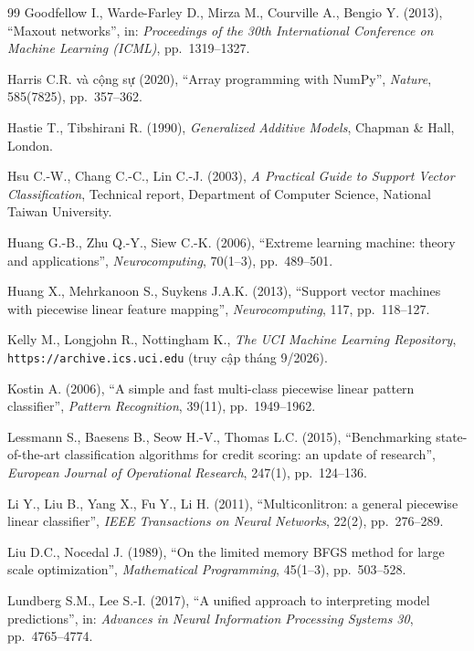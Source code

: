 \begin{thebibliography}{99}
 Goodfellow I., Warde-Farley D., Mirza M., Courville A., Bengio Y. (2013), “Maxout networks”, in: \emph{Proceedings of the 30th International Conference on Machine Learning (ICML)}, pp.~1319--1327.

 Harris C.R. và cộng sự (2020), “Array programming with NumPy”, \emph{Nature}, 585(7825), pp.~357--362.

 Hastie T., Tibshirani R. (1990), \emph{Generalized Additive Models}, Chapman \& Hall, London.

 Hsu C.-W., Chang C.-C., Lin C.-J. (2003), \emph{A Practical Guide to Support Vector Classification}, Technical report, Department of Computer Science, National Taiwan University.

 Huang G.-B., Zhu Q.-Y., Siew C.-K. (2006), “Extreme learning machine: theory and applications”, \emph{Neurocomputing}, 70(1--3), pp.~489--501.

 Huang X., Mehrkanoon S., Suykens J.A.K. (2013), “Support vector machines with piecewise linear feature mapping”, \emph{Neurocomputing}, 117, pp.~118--127.

 Kelly M., Longjohn R., Nottingham K., \emph{The UCI Machine Learning Repository}, \texttt{https://archive.ics.uci.edu} (truy cập tháng 9/2026).

 Kostin A. (2006), “A simple and fast multi-class piecewise linear pattern classifier”, \emph{Pattern Recognition}, 39(11), pp.~1949--1962.

 Lessmann S., Baesens B., Seow H.-V., Thomas L.C. (2015), “Benchmarking state-of-the-art classification algorithms for credit scoring: an update of research”, \emph{European Journal of Operational Research}, 247(1), pp.~124--136.

 Li Y., Liu B., Yang X., Fu Y., Li H. (2011), “Multiconlitron: a general piecewise linear classifier”, \emph{IEEE Transactions on Neural Networks}, 22(2), pp.~276--289.

 Liu D.C., Nocedal J. (1989), “On the limited memory BFGS method for large scale optimization”, \emph{Mathematical Programming}, 45(1--3), pp.~503--528.

 Lundberg S.M., Lee S.-I. (2017), “A unified approach to interpreting model predictions”, in: \emph{Advances in Neural Information Processing Systems 30}, pp.~4765--4774.


\end{thebibliography}
